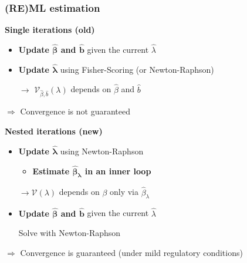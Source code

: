 \documentclass[final]{beamer}
\begin{document}





\begin{frame}
\frametitle{(RE)ML estimation}

\textcolor{beamer@postercolour}{\textbf{Single iterations (old)}}
\begin{itemize}
\item \textbf{Update  $\boldsymbol{\hat{\beta}}$ and $\boldsymbol{\hat{b}}$} given the current $\hat{\lambda}$
\item \textbf{Update $\boldsymbol{\hat{\lambda}}$} using Fisher-Scoring (or Newton-Raphson)

\vspace{0.2em}
$\rightarrow$ $\mathcal{V}_{\hat{\beta}, \hat{b}}(\lambda)$ depends on $\hat{\beta}$ and $\hat{b}$
\end{itemize}
$\Rightarrow$ Convergence is not guaranteed

\vspace{1em}
\pause

\textcolor{beamer@postercolour}{\textbf{Nested iterations (new)}}
\begin{itemize}
\item \textbf{Update $\boldsymbol{\hat{\lambda}}$} using Newton-Raphson

\begin{itemize}
\item \textbf{Estimate $\boldsymbol{\hat{\beta}_\lambda}$ in an inner loop}
\end{itemize}


$\rightarrow \mathcal{V}(\lambda)$ depends on $\beta$ only via $\hat{\beta}_\lambda$

\item \textbf{Update $\boldsymbol{\hat{\beta}}$ and $\boldsymbol{\hat{b}}$} given the current $\hat{\lambda}$

Solve with  Newton-Raphson
\end{itemize}
$\Rightarrow$ Convergence is guaranteed (under mild regulatory conditions)

\end{frame}
\end{document}
